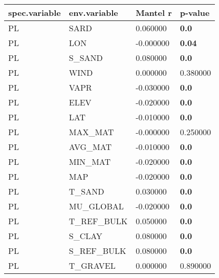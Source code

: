 \begin{tabular}{l l l l}
\toprule
spec.variable & env.variable & Mantel r & p-value \\
\midrule
PL & SARD & 0.060000 & \textbf{0.0} \\
PL & LON & -0.000000 & \textbf{0.04} \\
PL & S_SAND & 0.080000 & \textbf{0.0} \\
PL & WIND & 0.000000 & 0.380000 \\
PL & VAPR & -0.030000 & \textbf{0.0} \\
PL & ELEV & -0.020000 & \textbf{0.0} \\
PL & LAT & -0.010000 & \textbf{0.0} \\
PL & MAX_MAT & -0.000000 & 0.250000 \\
PL & AVG_MAT & -0.010000 & \textbf{0.0} \\
PL & MIN_MAT & -0.020000 & \textbf{0.0} \\
PL & MAP & -0.020000 & \textbf{0.0} \\
PL & T_SAND & 0.030000 & \textbf{0.0} \\
PL & MU_GLOBAL & -0.020000 & \textbf{0.0} \\
PL & T_REF_BULK & 0.050000 & \textbf{0.0} \\
PL & S_CLAY & 0.080000 & \textbf{0.0} \\
PL & S_REF_BULK & 0.080000 & \textbf{0.0} \\
PL & T_GRAVEL & 0.000000 & 0.890000 \\
\bottomrule
\end{tabular}
